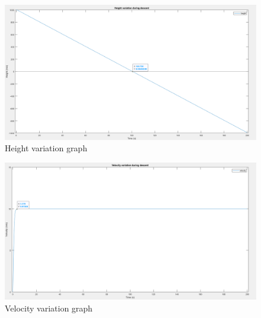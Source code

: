 \documentclass[11pt]{article}
\begin{document}
\begin{enumerate}
\begin{figure}[H]
\includegraphics[width=12cm]{Height_variation}
\centering
\caption{Height variation graph}
\end{figure}

\begin{figure}[H]
\includegraphics[width=12cm]{Velocity_variation}
\centering
\caption{Velocity variation graph}
\end{figure}

\end{enumerate}
\end{document}

